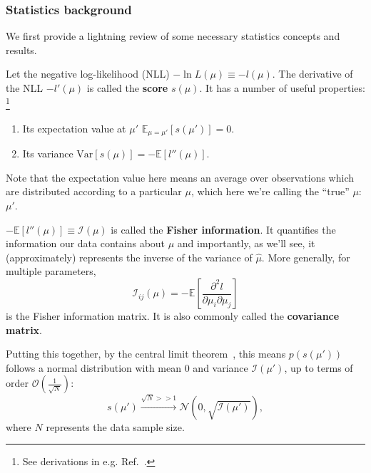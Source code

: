 \subsubsection{Statistics background}
\label{sec:03_pmle_bg}

We first provide a lightning review of some necessary statistics concepts and results.

\begin{definition}
\label{def:03_score}
Let the negative log-likelihood (NLL) $-\ln L(\mu) \equiv -l(\mu)$.
The derivative of the NLL $-l'(\mu)$ is called the \textbf{score} $s(\mu)$.
It has a number of useful properties:
\footnote{See derivations in e.g. Ref.~\cite{enwiki:1253018821}.}
\begin{enumerate}
  \item Its expectation value at $\mu'$ $\mathbb E_{\mu = \mu'}[s(\mu')] = 0$.
  \item Its variance $\mathrm {Var} [s(\mu)] = - \mathbb E [l''(\mu)]$.
\end{enumerate}
Note that the expectation value here means an average over observations which are distributed according to a particular $\mu$, which here we're calling the ``true'' $\mu$: $\mu'$.
\end{definition}

\begin{definition}
\label{def:03_fisher_information}
$- \mathbb E [l''(\mu)] \equiv \mathcal I(\mu)$ is called the \textbf{Fisher information}.
It quantifies the information our data contains about $\mu$ and importantly, as we'll see, it (approximately) represents the inverse of the variance of $\hat \mu$.
More generally, for multiple parameters,
\begin{equation}
\label{eq:03_fisher_matrix}
\mathcal I_{ij}(\mu) = - \mathbb E [\frac{\partial^2 l}{\partial \mu_i \partial \mu_j}]
\end{equation}
is the Fisher information matrix.
It is also commonly called the \textbf{covariance matrix}.
\end{definition}

\begin{theorem}
Putting this together, by the central limit theorem~\cite{enwiki:1257009135}, this means $p(s(\mu'))$ follows a normal distribution with mean $0$ and variance $\mathcal I(\mu')$, up to terms of order $\mathcal O(\frac{1}{\sqrt{N}})$:
\begin{equation}
s(\mu') \xrightarrow{\sqrt{N} >> 1} \mathcal N(0, \sqrt{\mathcal I(\mu')}),
\label{eq:03_score}
\end{equation}
where $N$ represents the data sample size.
\end{theorem}


